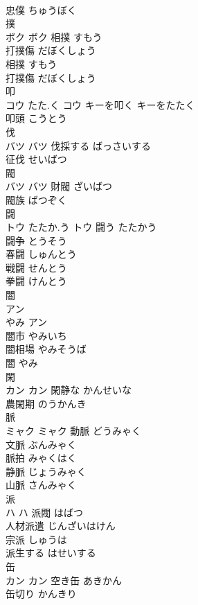 \documentclass[8pt]{extreport}
\begin{document}
\begin{CJK}{UTF8}{min}
\\	忠僕	ちゅうぼく	
\\	撲	
\\	ボク		ボク	相撲	すもう	
\\	打撲傷	だぼくしょう	
\\	相撲	すもう	
\\	打撲傷	だぼくしょう	
\\	叩	
\\	コウ	たた.く	コウ	キーを叩く	キーをたたく	
\\	叩頭	こうとう	
\\	伐	
\\	バツ		バツ	伐採する	ばっさいする	
\\	征伐	せいばつ	
\\	閥	
\\	バツ		バツ	財閥	ざいばつ	
\\	閥族	ばつぞく	
\\	闘	
\\	トウ	たたか.う	トウ	闘う	たたかう	
\\	闘争	とうそう	
\\	春闘	しゅんとう	
\\	戦闘	せんとう	
\\	拳闘	けんとう	
\\	闇	
\\	アン
\\	やみ	アン
\\	闇市	やみいち	
\\	闇相場	やみそうば	
\\	闇	やみ	
\\	閑	
\\	カン		カン	閑静な	かんせいな	
\\	農閑期	のうかんき	
\\	脈	
\\	ミャク		ミャク	動脈	どうみゃく	
\\	文脈	ぶんみゃく	
\\	脈拍	みゃくはく	
\\	静脈	じょうみゃく	
\\	山脈	さんみゃく	
\\	派	
\\	ハ		ハ	派閥	はばつ	
\\	人材派遣	じんざいはけん	
\\	宗派	しゅうは	
\\	派生する	はせいする	
\\	缶	
\\	カン		カン	空き缶	あきかん	
\\	缶切り	かんきり	

\end{CJK}
\end{document}
